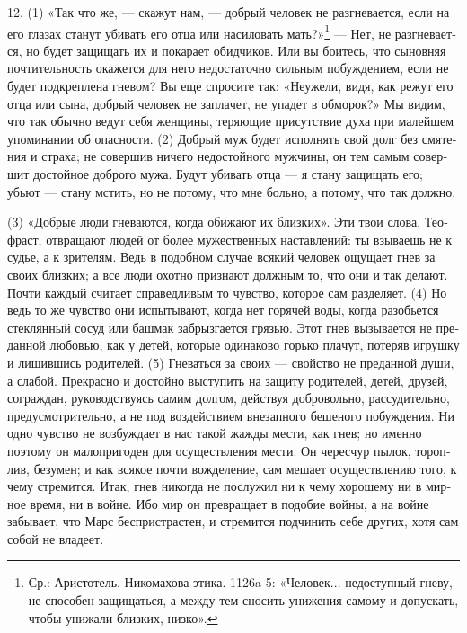 12. (1) «Так что же, --- ска­жут нам, --- доб­рый чело­век не раз­гне­ва­ет­ся, если на его гла­зах ста­нут уби­вать его отца или наси­ло­вать мать?»\footnote{Ср.: Ари­сто­тель. Нико­ма­хо­ва эти­ка. 1126a 5: «Чело­век... недо­ступ­ный гне­ву, не спо­со­бен защи­щать­ся, а меж­ду тем сно­сить уни­же­ния само­му и допус­кать, чтобы уни­жа­ли близ­ких, низ­ко».} --- Нет, не раз­гне­ва­ет­ся, но будет защи­щать их и пока­ра­ет обид­чи­ков. Или вы бои­тесь, что сынов­няя почти­тель­ность ока­жет­ся для него недо­ста­точ­но силь­ным побуж­де­ни­ем, если не будет под­креп­ле­на гне­вом? Вы еще спро­си­те так: «Неуже­ли, видя, как режут его отца или сына, доб­рый чело­век не запла­чет, не упа­дет в обмо­рок?» Мы видим, что так обыч­но ведут себя жен­щи­ны, теря­ю­щие при­сут­ст­вие духа при малей­шем упо­ми­на­нии об опас­но­сти. (2) Доб­рый муж будет испол­нять свой долг без смя­те­ния и стра­ха; не совер­шив ниче­го недо­стой­но­го муж­чи­ны, он тем самым совер­шит достой­ное доб­ро­го мужа. Будут уби­вать отца --- я ста­ну защи­щать его; убьют --- ста­ну мстить, но не пото­му, что мне боль­но, а пото­му, что так долж­но.

(3) «Доб­рые люди гне­ва­ют­ся, когда оби­жа­ют их близ­ких». Эти твои сло­ва, Тео­фраст, отвра­ща­ют людей от более муже­ст­вен­ных настав­ле­ний: ты взы­ва­ешь не к судье, а к зри­те­лям. Ведь в подоб­ном слу­чае вся­кий чело­век ощу­ща­ет гнев за сво­их близ­ких; а все люди охот­но при­зна­ют долж­ным то, что они и так дела­ют. Почти каж­дый счи­та­ет спра­вед­ли­вым то чув­ство, кото­рое сам разде­ля­ет. (4) Но ведь то же чув­ство они испы­ты­ва­ют, когда нет горя­чей воды, когда разо­бьет­ся стек­лян­ный сосуд или баш­мак забрыз­га­ет­ся гря­зью. Этот гнев вызы­ва­ет­ся не пре­дан­ной любо­вью, как у детей, кото­рые оди­на­ко­во горь­ко пла­чут, поте­ряв игруш­ку и лишив­шись роди­те­лей. (5) Гне­вать­ся за сво­их --- свой­ство не пре­дан­ной души, а сла­бой. Пре­крас­но и достой­но высту­пить на защи­ту роди­те­лей, детей, дру­зей, сограж­дан, руко­вод­ст­ву­ясь самим дол­гом, дей­ст­вуя доб­ро­воль­но, рас­суди­тель­но, пред­у­смот­ри­тель­но, а не под воздей­ст­ви­ем вне­зап­но­го беше­но­го побуж­де­ния. Ни одно чув­ство не воз­буж­да­ет в нас такой жаж­ды мести, как гнев; но имен­но поэто­му он мало­при­го­ден для осу­щест­вле­ния мести. Он черес­чур пылок, тороп­лив, безу­мен; и как вся­кое почти вожде­ле­ние, сам меша­ет осу­щест­вле­нию того, к чему стре­мит­ся. Итак, гнев нико­гда не послу­жил ни к чему хоро­ше­му ни в мир­ное вре­мя, ни в войне. Ибо мир он пре­вра­ща­ет в подо­бие вой­ны, а на войне забы­ва­ет, что Марс бес­при­стра­стен, и стре­мит­ся под­чи­нить себе дру­гих, хотя сам собой не вла­де­ет.

